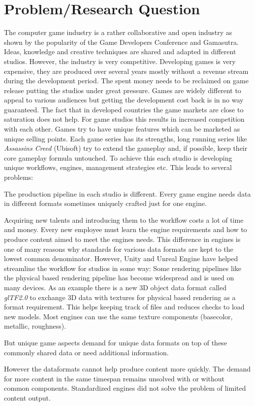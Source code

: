 \documentclass[10pt,a4paper]{article}
\begin{document}
\section{Problem/Research Question}
\begin{multicols}{2}
The computer game industry is a rather collaborative and open industry as shown by the popularity of the Game Developers Conference\cite{GDC2019} and Gamasutra\cite{Gamasutra2019}. Ideas, knowledge and creative techniques are shared and adapted in different studios. However, the industry is very competitive. Developing games is very expensive, they are produced over several years mostly without a revenue stream during the development period. The spent money needs to be reclaimed on game release putting the studios under great pressure. Games are widely different to appeal to various audiences but getting the development cost back is in no way guaranteed. The fact that in developed countries the game markets are close to saturation\cite{Koster2018} does not help. For game studios this results in increased competition with each other. Games try to have unique features which can be marketed as unique selling points. Each game series has its strengths, long running series like \textit{Assassins Creed} (Ubisoft) try to extend the gameplay and, if possible, keep their core gameplay formula untouched. To achieve this each studio is developing unique workflows, engines, management strategies etc. This leads to several problems: \begin{inlinelist} \item The production pipeline in each studio is different. Every game engine needs data in different formats sometimes uniquely crafted just for one engine. \item Acquiring new talents and introducing them to the workflow costs a lot of time and money. Every new employee must learn the engine requirements and how to produce content aimed to meet the engines needs. This difference in engines is one of many reasons why standards for various data formats are kept to the lowest common denominator. However, Unity and Unreal Engine have helped streamline the workflow for studios in some way: Some rendering pipelines like the physical based rendering pipeline has become widespread and is used on many devices. As an example there is a new 3D object data format called \textit{glTF2.0} to exchange 3D data with textures for physical based rendering as a format requirement\cite{TheKhronosGroup}. This helps keeping track of files and reduces checks to load new models. Most engines can use the same texture components (basecolor, metallic, roughness). \item But unique game aspects demand for unique data formats on top of these commonly shared data or need additional information. \item However the dataformats cannot help produce content more quickly. The demand for more content in the same timespan remains unsolved with or without common components. Standardized engines did not solve the problem of limited content output\cite{Koster2018}.\end{inlinelist}


\end{multicols}
\end{document}
